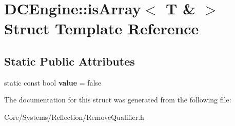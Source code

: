\hypertarget{structDCEngine_1_1isArray_3_01T_01_6_01_4}{\section{D\-C\-Engine\-:\-:is\-Array$<$ T \& $>$ Struct Template Reference}
\label{structDCEngine_1_1isArray_3_01T_01_6_01_4}
}
\subsection*{Static Public Attributes}
\begin{DoxyCompactItemize}
\item 
\hypertarget{structDCEngine_1_1isArray_3_01T_01_6_01_4_ac046a41c27751435305cc2fa50f3ecf4}{static const bool {\bfseries value} = false}\label{structDCEngine_1_1isArray_3_01T_01_6_01_4_ac046a41c27751435305cc2fa50f3ecf4}

\end{DoxyCompactItemize}


The documentation for this struct was generated from the following file\-:\begin{DoxyCompactItemize}
\item 
Core/\-Systems/\-Reflection/Remove\-Qualifier.\-h\end{DoxyCompactItemize}
